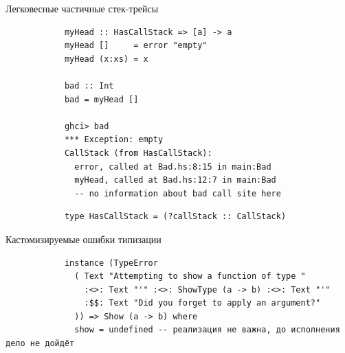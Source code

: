     \begin{frame}[fragile]{Легковесные частичные стек-трейсы}
        \pause
        \begin{verbatim}
            myHead :: HasCallStack => [a] -> a
            myHead []     = error "empty"
            myHead (x:xs) = x

            bad :: Int
            bad = myHead []

            ghci> bad
            *** Exception: empty
            CallStack (from HasCallStack):
              error, called at Bad.hs:8:15 in main:Bad
              myHead, called at Bad.hs:12:7 in main:Bad
              -- no information about bad call site here
        \end{verbatim}
        \pause\vspace{1em}
        \begin{verbatim}
            type HasCallStack = (?callStack :: CallStack)
        \end{verbatim}
    \end{frame}

    \begin{frame}[fragile]{Кастомизируемые ошибки типизации}
        \pause
        \begin{verbatim}
            instance (TypeError
              ( Text "Attempting to show a function of type "
                :<>: Text "'" :<>: ShowType (a -> b) :<>: Text "'"
                :$$: Text "Did you forget to apply an argument?"
              )) => Show (a -> b) where
              show = undefined -- реализация не важна, до исполнения дело не дойдёт
        \end{verbatim}
    \end{frame}


